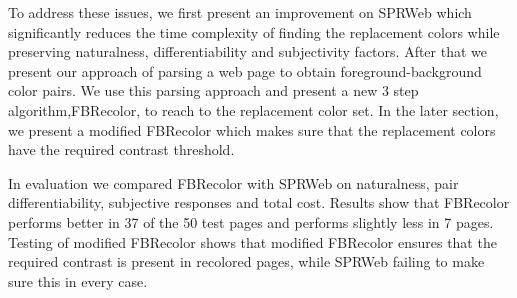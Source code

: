To address these issues, we first present an improvement on SPRWeb which significantly reduces the time complexity of finding the replacement colors while preserving naturalness, differentiability and subjectivity factors. After that we present our approach of parsing a web page to obtain foreground-background color pairs. We use this parsing approach and present a new 3 step algorithm,FBRecolor,  to reach to the replacement color set. In the later section, we present a modified FBRecolor which makes sure that the replacement colors have the required contrast threshold. 

In evaluation we compared FBRecolor with SPRWeb on naturalness, pair differentiability, subjective responses and total cost. Results show that FBRecolor performs better in 37 of the 50 test pages and performs slightly less in 7 pages. Testing of modified FBRecolor shows that modified FBRecolor ensures that the required contrast is present in recolored pages, while SPRWeb failing to make sure this in every case.   	